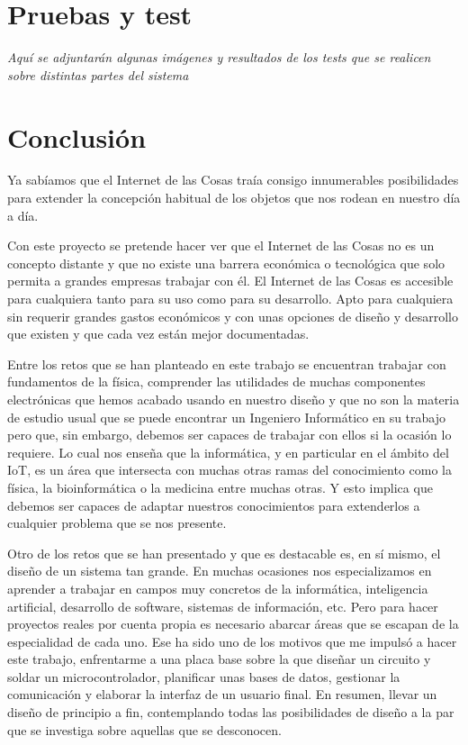 \documentclass[a4paper,10pt]{article}
\begin{document}
\newpage

\section{Pruebas y test}\label{tests}

\textit{Aquí se adjuntarán algunas imágenes y resultados de los tests
  que se realicen sobre distintas partes del sistema}

\newpage

\section{Conclusión}\label{conclusion}

Ya sabíamos que el Internet de las Cosas traía consigo innumerables
posibilidades para extender la concepción habitual de los objetos que
nos rodean en nuestro día a día.

Con este proyecto se pretende hacer ver que el Internet de las Cosas
no es un concepto distante y que no existe una barrera económica o
tecnológica que solo permita a grandes empresas trabajar con él. El
Internet de las Cosas es accesible para cualquiera tanto para su uso
como para su desarrollo. Apto para cualquiera sin requerir grandes
gastos económicos y con unas opciones de diseño y desarrollo que
existen y que cada vez están mejor documentadas.

Entre los retos que se han planteado en este trabajo se encuentran
trabajar con fundamentos de la física, comprender las utilidades de
muchas componentes electrónicas que hemos acabado usando en nuestro
diseño y que no son la materia de estudio usual que se puede encontrar
un Ingeniero Informático en su trabajo pero que, sin embargo, debemos
ser capaces de trabajar con ellos si la ocasión lo requiere. Lo cual
nos enseña que la informática, y en particular en el ámbito del IoT,
es un área que intersecta con muchas otras ramas del conocimiento como
la física, la bioinformática o la medicina entre muchas otras. Y esto
implica que debemos ser capaces de adaptar nuestros conocimientos para
extenderlos a cualquier problema que se nos presente.

Otro de los retos que se han presentado y que es destacable es, en sí
mismo, el diseño de un sistema tan grande. En muchas ocasiones nos
especializamos en aprender a trabajar en campos muy concretos de la
informática, inteligencia artificial, desarrollo de software, sistemas
de información, etc. Pero para hacer proyectos reales por cuenta
propia es necesario abarcar áreas que se escapan de la especialidad de
cada uno. Ese ha sido uno de los motivos que me impulsó a hacer este
trabajo, enfrentarme a una placa base sobre la que diseñar un circuito
y soldar un microcontrolador, planificar unas bases de datos,
gestionar la comunicación y elaborar la interfaz de un usuario
final. En resumen, llevar un diseño de principio a fin, contemplando
todas las posibilidades de diseño a la par que se investiga sobre
aquellas que se desconocen.
\end{document}
